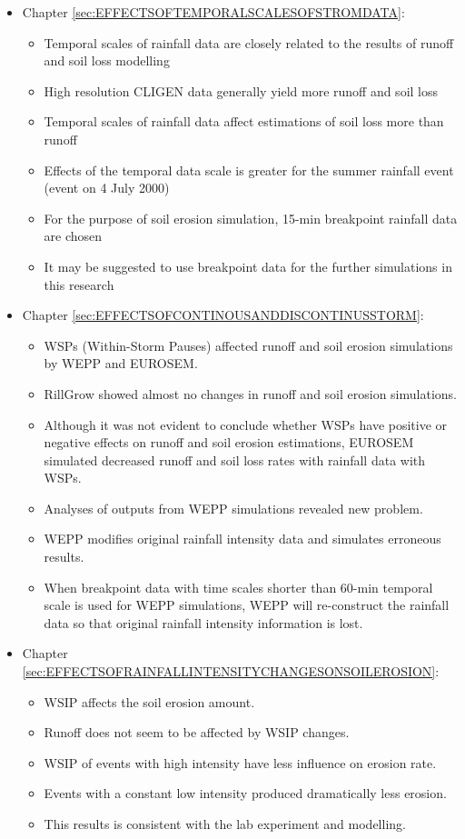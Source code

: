 \begin{itemize}
  \item Chapter \ref{sec:EFFECTSOFTEMPORALSCALESOFSTROMDATA}:
  \begin{itemize}
      \item Temporal scales of rainfall data are closely related to the results
of runoff and soil loss modelling
      \item High resolution CLIGEN data generally yield more runoff and soil
loss
      \item Temporal scales of rainfall data affect estimations of soil loss
more than runoff
      \item Effects of the temporal data scale is greater for the summer
rainfall event (event on 4 July 2000)
      \item For the purpose of soil erosion simulation, 15-min breakpoint
rainfall data are chosen
      \item It may be suggested to use breakpoint data for the further
simulations in this research
  \end{itemize}
  \item Chapter \ref{sec:EFFECTSOFCONTINOUSANDDISCONTINUSSTORM}:
    \begin{itemize}
      \item WSPs (Within-Storm Pauses) affected runoff and soil erosion
simulations by WEPP and EUROSEM.
      \item RillGrow showed almost no changes in runoff and soil erosion
simulations.
      \item Although it was not evident to conclude whether WSPs have
positive or negative effects on runoff and soil erosion estimations, EUROSEM
simulated decreased runoff and soil loss rates with rainfall data with WSPs.
      \item Analyses of outputs from WEPP simulations revealed new problem.
      \item WEPP modifies original rainfall intensity data and simulates
erroneous results.
      \item When breakpoint data with time scales shorter than 60-min temporal
scale is used for WEPP simulations, WEPP will re-construct the rainfall data so
that original rainfall intensity information is lost.
    \end{itemize}
  \item Chapter \ref{sec:EFFECTSOFRAINFALLINTENSITYCHANGESONSOILEROSION}:
    \begin{itemize}
      \item WSIP affects the soil erosion amount.
      \item Runoff does not seem to be affected by WSIP changes.
      \item WSIP of events with high intensity have less influence on erosion
rate.
      \item Events with a constant low intensity produced dramatically less
erosion.
      \item This results is consistent with the lab experiment and modelling.
    \end{itemize}
\end{itemize}

